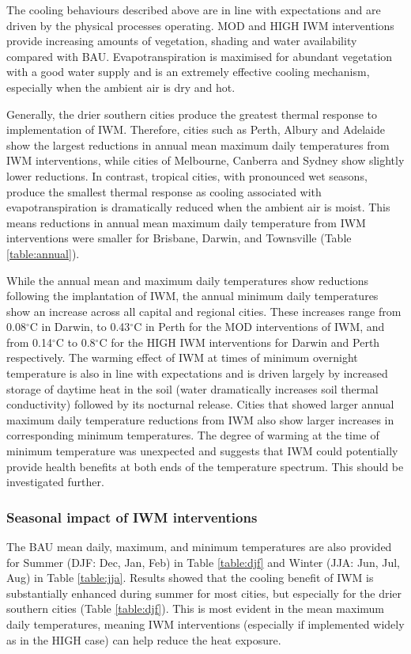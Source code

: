 \documentclass[final,3p,times,authoryear]{elsarticle}
\begin{document}
The cooling behaviours described above are in line with expectations and are driven by the physical processes operating. MOD and HIGH IWM interventions provide increasing amounts of vegetation, shading and water availability compared with BAU. Evapotranspiration is maximised for abundant vegetation with a good water supply and is an extremely effective cooling mechanism, especially when the ambient air is dry and hot. 

Generally, the drier southern cities produce the greatest thermal response to implementation of IWM. Therefore, cities such as Perth, Albury and Adelaide show the largest reductions in annual mean maximum daily temperatures from IWM interventions, while cities of Melbourne, Canberra and Sydney show slightly lower reductions. In contrast, tropical cities, with pronounced wet seasons, produce the smallest thermal response as cooling associated with evapotranspiration is dramatically reduced when the ambient air is moist. This means reductions in annual mean maximum daily temperature from IWM interventions were smaller for Brisbane, Darwin, and Townsville (Table \ref{table:annual}). 

While the annual mean and maximum daily temperatures show reductions following the implantation of IWM, the annual minimum daily temperatures show an increase across all capital and regional cities. These increases range from 0.08$^{\circ}$C in Darwin, to 0.43$^{\circ}$C in Perth for the MOD interventions of IWM, and from 0.14$^{\circ}$C to 0.8$^{\circ}$C for the HIGH IWM interventions for Darwin and Perth respectively. The warming effect of IWM at times of minimum overnight temperature is also in line with expectations and is driven largely by increased storage of daytime heat in the soil (water dramatically increases soil thermal conductivity) followed by its nocturnal release. Cities that showed larger annual maximum daily temperature reductions from IWM also show larger increases in corresponding minimum temperatures. The degree of warming at the time of minimum temperature was unexpected and suggests that IWM could potentially provide health benefits at both ends of the temperature spectrum. This should be investigated further.

\subsubsection{Seasonal impact of IWM interventions}\label{sec:results2b}

The BAU mean daily, maximum, and minimum temperatures are also provided for Summer (DJF: Dec, Jan, Feb) in Table \ref{table:djf} and Winter (JJA: Jun, Jul, Aug) in Table \ref{table:jja}. Results showed that the cooling benefit of IWM is substantially enhanced during summer for most cities, but especially for the drier southern cities (Table \ref{table:djf}). This is most evident in the mean maximum daily temperatures, meaning IWM interventions (especially if implemented widely as in the HIGH case) can help reduce the heat exposure.
\end{document}
